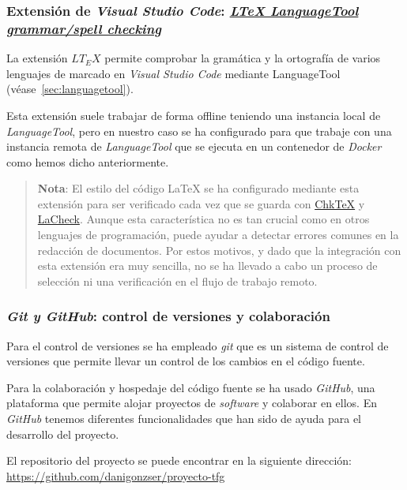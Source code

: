 \subsubsection{Extensión de \textit{Visual Studio Code}: \href{https://github.com/valentjn/vscode-ltex}{\textit{LTeX LanguageTool grammar/spell checking}}}

La extensión \( LT_E X \) permite comprobar la gramática y la ortografía de varios lenguajes de marcado en \textit{Visual Studio Code} mediante LanguageTool (véase~\ref{sec:languagetool}).

Esta extensión suele trabajar de forma offline teniendo una instancia local de \textit{LanguageTool}, pero en nuestro caso se ha configurado para que trabaje con una instancia remota de \textit{LanguageTool} que se ejecuta en un contenedor de \textit{Docker} como hemos dicho anteriormente.

\begin{quote}
    \textbf{Nota}: El estilo del código \LaTeX{} se ha configurado mediante esta extensión para ser verificado cada vez que se guarda con \href{https://www.nongnu.org/chktex/}{ChkTeX} y \href{https://ctan.org/pkg/lacheck}{LaCheck}. Aunque esta característica no es tan crucial como en otros lenguajes de programación, puede ayudar a detectar errores comunes en la redacción de documentos. Por estos motivos, y dado que la integración con esta extensión era muy sencilla, no se ha llevado a cabo un proceso de selección ni una verificación en el flujo de trabajo remoto.
\end{quote}

\subsubsection{\textit{Git y GitHub}: control de versiones y colaboración}

Para el control de versiones se ha empleado \textit{git} que es un sistema de control de versiones que permite llevar un control de los cambios en el código fuente.

Para la colaboración y hospedaje del código fuente se ha usado \textit{GitHub}, una plataforma que permite alojar proyectos de \textit{software} y colaborar en ellos. En \textit{GitHub} tenemos diferentes funcionalidades que han sido de ayuda para el desarrollo del proyecto.

El repositorio del proyecto se puede encontrar en la siguiente dirección: \url{https://github.com/danigonzser/proyecto-tfg}

